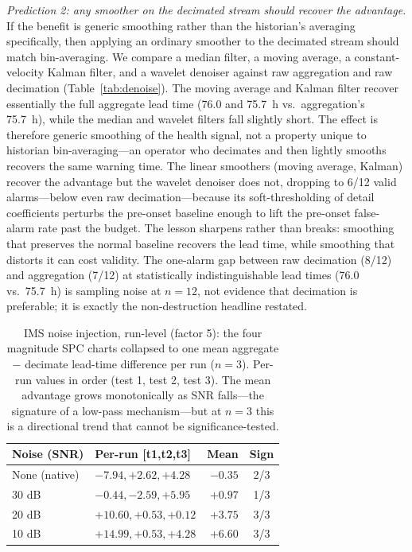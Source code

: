 \documentclass[IJPHM, 2026, 0]{PHMSociety}
\begin{document}
\emph{Prediction 2: any smoother on the decimated stream should recover the advantage.} If the benefit is generic smoothing rather than the historian's averaging specifically, then applying an ordinary smoother to the decimated stream should match bin-averaging. We compare a median filter, a moving average, a constant-velocity Kalman filter, and a wavelet denoiser against raw aggregation and raw decimation (Table~\ref{tab:denoise}). The moving average and Kalman filter recover essentially the full aggregate lead time (76.0 and 75.7~h vs.\ aggregation's 75.7~h), while the median and wavelet filters fall slightly short. The effect is therefore generic smoothing of the health signal, not a property unique to historian bin-averaging---an operator who decimates and then lightly smooths recovers the same warning time. The linear smoothers (moving average, Kalman) recover the advantage but the wavelet denoiser does not, dropping to 6/12 valid alarms---below even raw decimation---because its soft-thresholding of detail coefficients perturbs the pre-onset baseline enough to lift the pre-onset false-alarm rate past the budget. The lesson sharpens rather than breaks: smoothing that preserves the normal baseline recovers the lead time, while smoothing that distorts it can cost validity. The one-alarm gap between raw decimation (8/12) and aggregation (7/12) at statistically indistinguishable lead times (76.0 vs.\ 75.7~h) is sampling noise at $n=12$, not evidence that decimation is preferable; it is exactly the non-destruction headline restated.

\begin{table}[t] \small
	\begin{center}
	\caption{IMS noise injection, run-level (factor 5): the four magnitude SPC charts collapsed to one mean aggregate $-$ decimate lead-time difference per run ($n=3$). Per-run values in order (test 1, test 2, test 3). The mean advantage grows monotonically as SNR falls---the signature of a low-pass mechanism---but at $n=3$ this is a directional trend that cannot be significance-tested.}
	\label{tab:noise}
	\begin{tabular}{l l r c}
		\hline \hline
		\textbf{Noise (SNR)} & \textbf{Per-run [t1,t2,t3]} & \textbf{Mean} & \textbf{Sign} \\
		\hline
		None (native) & $-7.94, +2.62, +4.28$ & $-0.35$ & 2/3 \\
		30 dB & $-0.44, -2.59, +5.95$ & $+0.97$ & 1/3 \\
		20 dB & $+10.60, +0.53, +0.12$ & $+3.75$ & 3/3 \\
		10 dB & $+14.99, +0.53, +4.28$ & $+6.60$ & 3/3 \\
		\hline \hline
	\end{tabular}
	\end{center}
\end{table}
\end{document}
